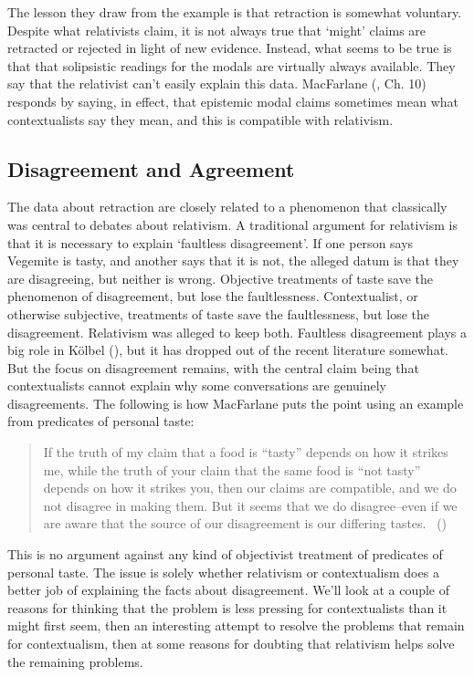 \documentclass[
  10pt,
  letterpaper,
  DIV=11,
  numbers=noendperiod,
  twoside]{scrartcl}
\begin{document}
The lesson they draw from the example is that retraction is somewhat
voluntary. Despite what relativists claim, it is not always true that
`might' claims are retracted or rejected in light of new evidence.
Instead, what seems to be true is that that solipsistic readings for the
modals are virtually always available. They say that the relativist
can't easily explain this data. MacFarlane
(, Ch. 10) responds by saying, in
effect, that epistemic modal claims sometimes mean what contextualists
say they mean, and this is compatible with relativism.

\subsection{Disagreement and Agreement}\label{disagreementandagreement}

The data about retraction are closely related to a phenomenon that
classically was central to debates about relativism. A traditional
argument for relativism is that it is necessary to explain `faultless
disagreement'. If one person says Vegemite is tasty, and another says
that it is not, the alleged datum is that they are disagreeing, but
neither is wrong. Objective treatments of taste save the phenomenon of
disagreement, but lose the faultlessness. Contextualist, or otherwise
subjective, treatments of taste save the faultlessness, but lose the
disagreement. Relativism was alleged to keep both. Faultless
disagreement plays a big role in Kölbel
(), but it has dropped out of the recent
literature somewhat. But the focus on disagreement remains, with the
central claim being that contextualists cannot explain why some
conversations are genuinely disagreements. The following is how
MacFarlane puts the point using an example from predicates of personal
taste:

\begin{quote}
If the truth of my claim that a food is ``tasty'' depends on how it
strikes me, while the truth of your claim that the same food is ``not
tasty'' depends on how it strikes you, then our claims are compatible,
and we do not disagree in making them. But it seems that we do
disagree--even if we are aware that the source of our disagreement is
our differing tastes. ~()
\end{quote}

This is no argument against any kind of objectivist treatment of
predicates of personal taste. The issue is solely whether relativism or
contextualism does a better job of explaining the facts about
disagreement. We'll look at a couple of reasons for thinking that the
problem is less pressing for contextualists than it might first seem,
then an interesting attempt to resolve the problems that remain for
contextualism, then at some reasons for doubting that relativism helps
solve the remaining problems.
\end{document}
